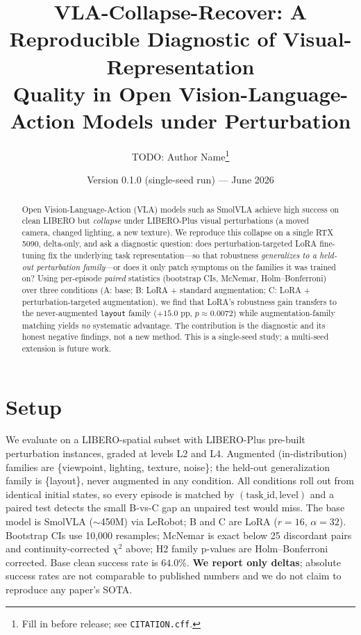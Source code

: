 \documentclass[11pt]{article}
\title{VLA-Collapse-Recover: A Reproducible Diagnostic of Visual-Representation\\
Quality in Open Vision-Language-Action Models under Perturbation}
\author{TODO: Author Name\thanks{Fill in before release; see \texttt{CITATION.cff}.}}
\date{Version 0.1.0 (single-seed run) --- June 2026}
\begin{document}
\maketitle

\begin{abstract}
Open Vision-Language-Action (VLA) models such as SmolVLA achieve high success on clean LIBERO but
\emph{collapse} under LIBERO-Plus visual perturbations (a moved camera, changed lighting, a new
texture). We reproduce this collapse on a single RTX 5090, delta-only, and ask a diagnostic
question: does perturbation-targeted LoRA fine-tuning fix the underlying task representation---so
that robustness \emph{generalizes to a held-out perturbation family}---or does it only patch
symptoms on the families it was trained on? Using per-episode \emph{paired} statistics (bootstrap
CIs, McNemar, Holm--Bonferroni) over three conditions (A: base; B: LoRA + standard augmentation; C:
LoRA + perturbation-targeted augmentation), we find that LoRA's robustness gain transfers to the
never-augmented \texttt{layout} family ($+15.0$ pp, $p\approx0.0072$) while augmentation-family
matching yields \emph{no} systematic advantage. The contribution is the diagnostic and its honest
negative findings, not a new method. This is a single-seed study; a multi-seed extension is future
work.
\end{abstract}

\section{Setup}
We evaluate on a LIBERO-spatial subset with LIBERO-Plus pre-built perturbation instances, graded at
levels L2 and L4. Augmented (in-distribution) families are \{viewpoint, lighting, texture, noise\};
the held-out generalization family is \{layout\}, never augmented in any condition. All conditions
roll out from identical initial states, so every episode is matched by $(\text{task\_id},
\text{level})$ and a paired test detects the small B-vs-C gap an unpaired test would miss. The base
model is SmolVLA ($\sim$450M) via LeRobot; B and C are LoRA ($r{=}16$, $\alpha{=}32$). Bootstrap CIs
use 10{,}000 resamples; McNemar is exact below 25 discordant pairs and continuity-corrected
$\chi^2$ above; H2 family p-values are Holm--Bonferroni corrected. Base clean success rate is
$64.0\%$. \textbf{We report only deltas}; absolute success rates are not comparable to published
numbers and we do not claim to reproduce any paper's SOTA.
\end{document}
